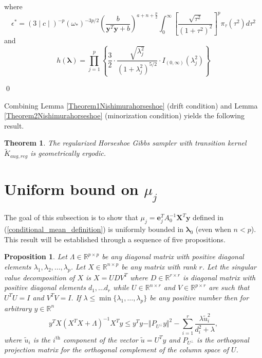 \documentclass[noinfoline,11pt]{imsart}
\numberwithin{equation}{section}
\theoremstyle{plain}
\newtheorem{thm}{Theorem}[section]
\newtheorem{prop}{Proposition}[section]
\newcommand{\y}{\mathbf{y}}
\newcommand{\X}{\mathbf{X}}
\newcommand{\bl}{\boldsymbol{\lambda}}
\newcommand{\lmLambda}{\Lambda}
\newcommand{\lmlambda}{\lambda}
\newcommand{\lmX}{X}
\newcommand{\lmy}{y}
\newcommand{\lmU}{U}
\newcommand{\lmu}{u}
\newcommand{\lmV}{V}
\newcommand{\lmD}{D}
\newcommand{\lmd}{d}
\newcommand{\R}{\mathbb{R}}
\newcommand{\norm}[1]{ \Vert #1 \Vert }
\begin{document}
\noindent

where 
$$\epsilon^*= (3\mid c\mid)^{-p}\left(\omega_*\right)^{-3p/2}\left(\frac{b}{\y^T\y+b}\right)^{a+n+\frac{p}{2}}\int_0^{\infty}\left[\frac{\sqrt{\tau^2}}{\left(1+\tau^2\right)^2}\right]^{p}\pi_\tau\left(\tau^2\right) d\tau^2$$
and $$h\left(\bl\right)=\prod_{j=1}^p\left\{\frac{3}{2}\cdot\frac{\sqrt{\lambda_j^2}}{\left(1+\lambda_j^2\right)^{5/2}}\cdot I_{(0,\infty)}\left(\lambda_j^2\right)\right\}$$

\qed

Combining Lemma \ref{Theorem1Nishimurahorseshoe} (drift condition) and Lemma \ref{Theorem2Nishimurahorseshoe} (minorization condition) yields the following result.

\begin{thm}
The regularized Horseshoe Gibbs sampler with transition kernel $\tilde K_{aug,reg}$ is geometrically ergodic. 
\end{thm}
\fi

\appendix

\section{Uniform bound on $\mu_j$} \label{Appendix A}

\noindent
The goal of this subsection is to show that $\mu_j = 
\boldsymbol{e}_j^TA_0^{-1}\X^T\y$ defined in 
(\ref{conditional_mean_definition}) is uniformly bounded in $\bl_0$ (even 
when $n < p$). This result will be established through a sequence of five 
propositions. 
\begin{prop} \label{result:lm1}
Let $\lmLambda\in \R^{p\times p}$ be any diagonal matrix with positive diagonal elements $\lmlambda_1, \lmlambda_2, \ldots, \lmlambda_p $.  Let $\lmX\in \R^{n\times p}$ be any matrix with rank $r$.  Let  the singular value decomposition of $X$ is $\lmX=\lmU\lmD\lmV^T$ where  $ \lmD\in \R^{r\times r}$  is diagonal matrix with positive diagonal elements $\lmd_1, \ldots \lmd_r$ while    $\lmU\in \R^{n\times r}$ and  $\lmV\in \R^{p\times r}$ are such that  $\lmU^T\lmU=I$ and  $\lmV^T\lmV=I$.   If $\lmlambda\leq \min\{\lmlambda_1, \ldots , \lmlambda_p\}$ be any positive number then for arbitrary $\lmy\in \R^n$
$$   \lmy^T\lmX (\lmX^T\lmX +\lmLambda)^{-1}\lmX^T\lmy\leq \lmy^T\lmy-  \norm{P_{\lmU^\perp}\lmy}^2-\sum_{i=1}^{r}\frac{\lmlambda \tilde{\lmu}^2_i}{\lmd_i^2+\lmlambda},$$
where $\tilde{\lmu}_i$ is the $i^{\text{th}}$ component of the vector $\tilde{\lmu}=\lmU^T\lmy$ and $ P_{\lmU^\perp}  $ is the orthogonal projection matrix for the orthogonal complement of the column space of $\lmU$.
\end{prop}
\end{document}
